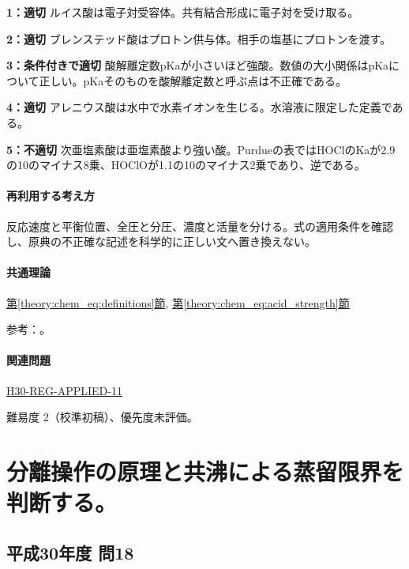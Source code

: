 \noindent\textbf{1：適切} ルイス酸は電子対受容体。共有結合形成に電子対を受け取る。\par

\noindent\textbf{2：適切} ブレンステッド酸はプロトン供与体。相手の塩基にプロトンを渡す。\par

\noindent\textbf{3：条件付きで適切} 酸解離定数pKaが小さいほど強酸。数値の大小関係はpKaについて正しい。pKaそのものを酸解離定数と呼ぶ点は不正確である。\par

\noindent\textbf{4：適切} アレニウス酸は水中で水素イオンを生じる。水溶液に限定した定義である。\par

\noindent\textbf{5：不適切} 次亜塩素酸は亜塩素酸より強い酸。Purdueの表ではHOClのKaが2.9の10のマイナス8乗、HOClOが1.1の10のマイナス2乗であり、逆である。\par

\paragraph{再利用する考え方} 反応速度と平衡位置、全圧と分圧、濃度と活量を分ける。式の適用条件を確認し、原典の不正確な記述を科学的に正しい文へ置き換えない。

\paragraph{共通理論} \hyperref[theory:chem_eq:definitions]{第\ref*{theory:chem_eq:definitions}節}, \hyperref[theory:chem_eq:acid_strength]{第\ref*{theory:chem_eq:acid_strength}節}

\par 参考：\cite{iupac_greenbook2012,purdue_acid_strength}。

\paragraph{関連問題} \hyperref[q:h30-reg-applied-11]{H30-REG-APPLIED-11}

\par 難易度 2（校準初稿）、優先度未評価。

\section{分離操作の原理と共沸による蒸留限界を判断する。}

\subsection{平成30年度 問18}
\label{q:h30-reg-applied-18}

